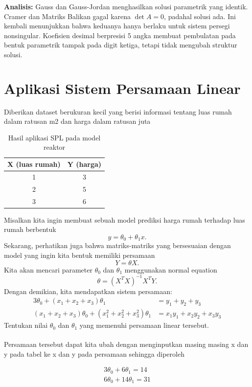 \documentclass[12pt,a4paper]{report}
\begin{document}
\textbf{Analisis:} Gauss dan Gauss-Jordan menghasilkan solusi parametrik yang identik. Cramer dan Matriks Balikan gagal karena $\det A=0$, padahal solusi ada. Ini kembali menunjukkan bahwa keduanya hanya berlaku untuk sistem persegi nonsingular. Koefisien desimal berpresisi 5 angka membuat pembulatan pada bentuk parametrik tampak pada digit ketiga, tetapi tidak mengubah struktur solusi.
 
 
\section{Aplikasi Sistem Persamaan Linear}
 
Diberikan dataset berukuran kecil yang berisi informasi tentang luas rumah dalam ratusan m2 dan harga
dalam ratusan juta

\begin{table}[H]
    \centering
    \caption{Hasil aplikasi SPL pada model reaktor}
    \begin{tabular}{|c|c|}
        \hline
        \textbf{X (luas rumah)} & \textbf{Y (harga)} \\
        \hline
        1 & 3 \\
        2 & 5 \\
        3 & 6 \\
        \hline
    \end{tabular}
\end{table}
 
Misalkan kita ingin membuat sebuah model prediksi harga rumah terhadap luas rumah berbentuk
\[
y = \theta_0 + \theta_1 x.
\]
Sekarang, perhatikan juga bahwa matriks-matriks yang bersesuaian dengan model yang ingin kita bentuk memiliki persamaan
\[
Y = \theta X.
\]
Kita akan mencari parameter \(\theta_0\) dan \(\theta_1\) menggunakan normal equation
\[
\theta = (X^T X)^{-1} X^T Y.
\]
Dengan demikian, kita mendapatkan sistem persamaan:
\begin{align*}
3\theta_0 + (x_1 + x_2 + x_3)\theta_1 &= y_1 + y_2 + y_3 \\
(x_1 + x_2 + x_3)\theta_0 + (x_1^2 + x_2^2 + x_3^2)\theta_1 &= x_1y_1 + x_2y_2 + x_3y_3
\end{align*}
Tentukan nilai \(\theta_0\) dan \(\theta_1\) yang memenuhi persamaan linear tersebut.
\\ \\
Persamaan tersebut dapat kita ubah dengan menginputkan masing masing x dan y pada tabel ke x dan y pada persamaan sehingga diperoleh

\begin{align*}
3\theta_0 + 6 \theta_1 = 14 \\
6\theta_0 + 14\theta_1 = 31
\end{align*}
\end{document}
